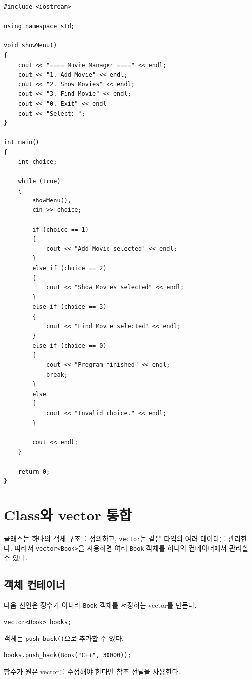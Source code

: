 \documentclass[11pt,a4paper]{article}
\begin{document}
\begin{lstlisting}
#include <iostream>

using namespace std;

void showMenu()
{
    cout << "==== Movie Manager ====" << endl;
    cout << "1. Add Movie" << endl;
    cout << "2. Show Movies" << endl;
    cout << "3. Find Movie" << endl;
    cout << "0. Exit" << endl;
    cout << "Select: ";
}

int main()
{
    int choice;

    while (true)
    {
        showMenu();
        cin >> choice;

        if (choice == 1)
        {
            cout << "Add Movie selected" << endl;
        }
        else if (choice == 2)
        {
            cout << "Show Movies selected" << endl;
        }
        else if (choice == 3)
        {
            cout << "Find Movie selected" << endl;
        }
        else if (choice == 0)
        {
            cout << "Program finished" << endl;
            break;
        }
        else
        {
            cout << "Invalid choice." << endl;
        }

        cout << endl;
    }

    return 0;
}
\end{lstlisting}

\section{Class와 vector 통합}
클래스는 하나의 객체 구조를 정의하고, \texttt{vector}는 같은 타입의 여러 데이터를 관리한다.
따라서 \texttt{vector<Book>}을 사용하면 여러 \texttt{Book} 객체를 하나의 컨테이너에서 관리할 수 있다.

\subsection{객체 컨테이너}
다음 선언은 정수가 아니라 \texttt{Book} 객체를 저장하는 vector를 만든다.

\begin{lstlisting}
vector<Book> books;
\end{lstlisting}

객체는 \texttt{push\_back()}으로 추가할 수 있다.

\begin{lstlisting}
books.push_back(Book("C++", 30000));
\end{lstlisting}

함수가 원본 vector를 수정해야 한다면 참조 전달을 사용한다.
\end{document}
